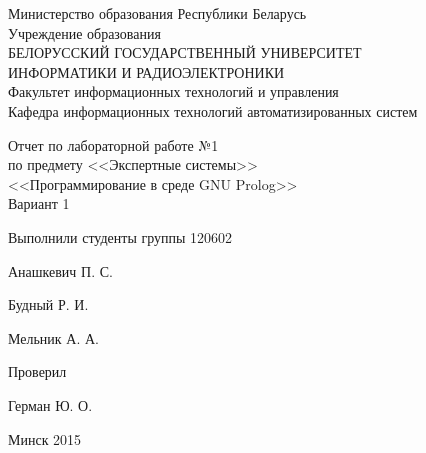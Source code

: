 \thispagestyle{empty}
\setlength{\parindent}{0ex} %

\begin{center}
  Министерство образования Республики Беларусь \\
  \smallskip
  Учреждение образования \\
  БЕЛОРУССКИЙ ГОСУДАРСТВЕННЫЙ УНИВЕРСИТЕТ \\
  ИНФОРМАТИКИ И РАДИОЭЛЕКТРОНИКИ \\
  \smallskip
  Факультет информационных технологий и управления \\
  \smallskip
  Кафедра информационных технологий автоматизированных систем
\end{center}

\vspace{40mm}

\begin{center}
  Отчет по лабораторной работе №1 \\
  по предмету <<Экспертные системы>> \\
  <<Программирование в среде GNU Prolog>> \\
  Вариант 1
\end{center}

\vspace{45mm}

\begin{minipage}{.55\linewidth}
    Выполнили студенты группы 120602
    \vspace{12mm}
\end{minipage}
\hfill
\begin{minipage}{.4\linewidth}
  \begin{flushright}
    Анашкевич П. С.

    Будный Р. И.

    Мельник А. А.
  \end{flushright}
\end{minipage}

\vspace{10mm}

\begin{minipage}{.55\linewidth}
    Проверил
\end{minipage}
\hfill
\begin{minipage}{.4\linewidth}
  \begin{flushright}
    Герман Ю. О.

  \end{flushright}
\end{minipage}

\vspace{40mm}
\begin{center}
  Минск 2015
\end{center}

\setlength{\parindent}{5ex} %
